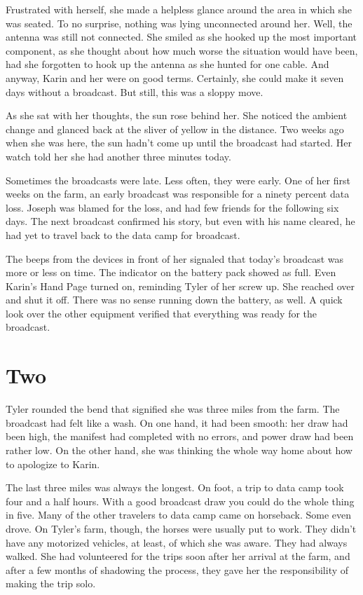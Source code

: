 \documentclass[12pt,novel,nonsubmission,smart]{sffms}
\begin{document}
Frustrated with herself, she made a helpless glance around the
area in which she was seated. To no surprise, nothing was lying
unconnected around her. Well, the antenna was still not
connected. She smiled as she hooked up the most important
component, as she thought about how much worse the situation
would have been, had she forgotten to hook up the antenna as she
hunted for one cable. And anyway, Karin and her were on good
terms. Certainly, she could make it seven days without a
broadcast. But still, this was a sloppy move.

As she sat with her thoughts, the sun rose behind her. She
noticed the ambient change and glanced back at the sliver of
yellow in the distance. Two weeks ago when she was here, the sun
hadn't come up until the broadcast had started. Her watch told
her she had another three minutes today.

Sometimes the broadcasts were late. Less often, they were early.
One of her first weeks on the farm, an early broadcast was
responsible for a ninety percent data loss. Joseph was blamed
for the loss, and had few friends for the following six days.
The next broadcast confirmed his story, but even with his name
cleared, he had yet to travel back to the data camp for
broadcast.

The beeps from the devices in front of her signaled that
today's broadcast was more or less on time. The indicator on the
battery pack showed as full. Even Karin's Hand Page turned on,
reminding Tyler of her screw up. She reached over and shut it
off. There was no sense running down the battery, as well. A
quick look over the other equipment verified that everything was
ready for the broadcast.

\chapter{Two}
Tyler rounded the bend that signified she was three miles from
the farm. The broadcast had felt like a wash. On one hand, it
had been smooth: her draw had been high, the manifest had
completed with no errors, and power draw had been rather low. On
the other hand, she was thinking the whole way home about how to
apologize to Karin.

The last three miles was always the longest. On foot, a trip to
data camp took four and a half hours. With a good broadcast draw
you could do the whole thing in five. Many of the other
travelers to data camp came on horseback. Some even drove. On
Tyler's farm, though, the horses were usually put to work. They
didn't have any motorized vehicles, at least, of which she was
aware. They had always walked. She had volunteered for the trips
soon after her arrival at the farm, and after a few months of
shadowing the process, they gave her the responsibility of
making the trip solo.
\end{document}
